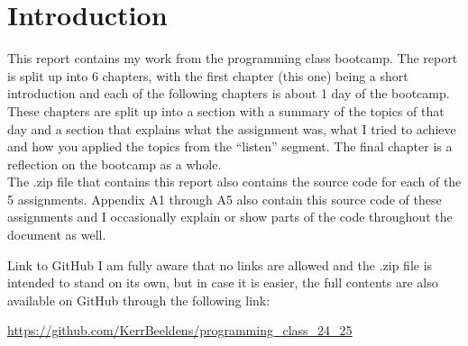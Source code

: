 \chapter{Introduction}
This report contains my work from the programming class bootcamp. The report is split up into 6 chapters, with the first chapter (this one) being a short introduction and each of the following chapters is about 1 day of the bootcamp. These chapters are split up into a section with a summary of the topics of that day and a section that explains what the assignment was, what I tried to achieve and how you applied the topics from the ``listen'' segment. The final chapter is a reflection on the bootcamp as a whole.\\

The .zip file that contains this report also contains the source code for each of the 5 assignments. Appendix A1 through A5 also contain this source code of these assignments and I occasionally explain or show parts of the code throughout the document as well.

\medskip

\begin{hyperlinkbox}{Link to GitHub}
    I am fully aware that no links are allowed and the .zip file is intended to stand on its own, but in case it is easier, the full contents are also available on GitHub through the following link:

    \medskip

    \href{https://github.com/KerrBeeldens/programming_class_24_25}{https://github.com/KerrBeeldens/programming\_class\_24\_25}
\end{hyperlinkbox}
